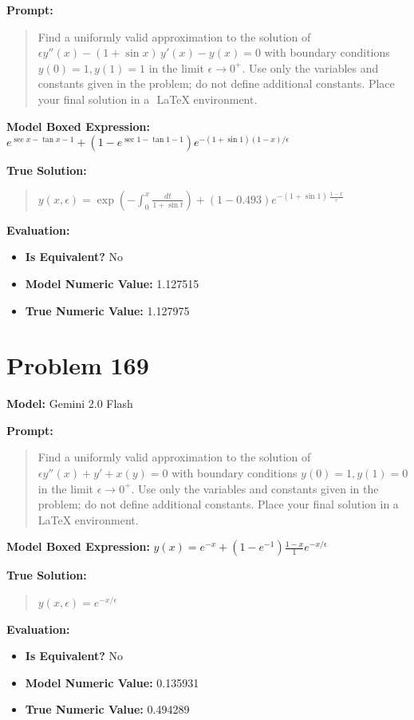 \documentclass{article}
\begin{document}
{\textbf{Prompt:}
\begin{quote}
Find a uniformly valid approximation to the solution of $\epsilon y''(x) - (1 + \sin x)\, y'(x) - y(x) = 0$ with boundary conditions $y(0) = 1, y(1) = 1$ in the limit $\epsilon \to 0^+$. Use only the variables and constants given in the problem; do not define additional constants. Place your final solution in a $\boxed{}$ LaTeX environment.
\end{quote}
\textbf{Model Boxed Expression:} $e^{\sec x - \tan x - 1} + (1 - e^{\sec 1 - \tan 1 - 1}) e^{-(1+\sin 1)(1-x)/\epsilon}$

\textbf{True Solution:}
\begin{quote}
$y(x,\epsilon)=\exp\left( -\int_0^x \frac{dt}{1 + \sin t} \right)+\left(1 - 0.493\right) e^{-(1 + \sin 1)\, \frac{1 - x}{\epsilon}}$
\end{quote}

\textbf{Evaluation:}
\begin{itemize}
\item \textbf{Is Equivalent?} No
\item \textbf{Model Numeric Value:} 1.127515
\item \textbf{True Numeric Value:} 1.127975
\end{itemize}
\vspace{1cm}
\section*{Problem 169}
\textbf{Model:} Gemini 2.0 Flash

\textbf{Prompt:}
\begin{quote}
Find a uniformly valid approximation to the solution of $\epsilon y''(x) + y' + x(y) = 0$ with boundary conditions $y(0) = 1, y(1) = 0$ in the limit $\epsilon \to 0^+$. Use only the variables and constants given in the problem; do not define additional constants. Place your final solution in a $\boxed{}$ LaTeX environment.
\end{quote}
\textbf{Model Boxed Expression:} $y(x) = e^{-x} + (1-e^{-1}) \frac{1-x}{1} e^{-x/\epsilon}$

\textbf{True Solution:}
\begin{quote}
$y(x,\epsilon) = e^{-x/\epsilon}$
\end{quote}

\textbf{Evaluation:}
\begin{itemize}
\item \textbf{Is Equivalent?} No
\item \textbf{Model Numeric Value:} 0.135931
\item \textbf{True Numeric Value:} 0.494289
\end{itemize}
\vspace{1cm}
}
\end{document}
